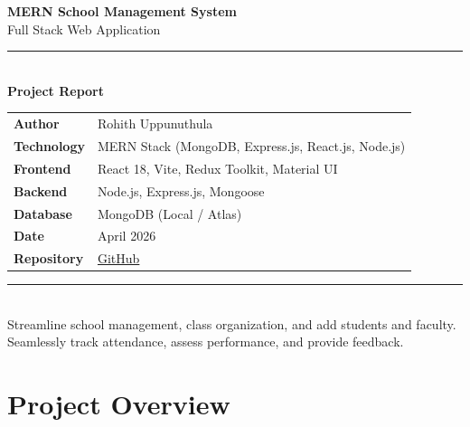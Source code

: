 \documentclass[12pt,a4paper]{report}
\begin{document}
\begin{titlepage}
  \centering
  \vspace*{2cm}

  {\Huge\bfseries\color{primaryblue} MERN School Management System}\\[0.6cm]
  {\large\color{codegray} Full Stack Web Application}\\[0.3cm]
  \rule{\linewidth}{0.5pt}\\[1.5cm]

  {\large\bfseries Project Report}\\[2cm]

  \begin{tabular}{ll}
    \textbf{Author}     & Rohith Uppunuthula \\[4pt]
    \textbf{Technology} & MERN Stack (MongoDB, Express.js, React.js, Node.js) \\[4pt]
    \textbf{Frontend}   & React 18, Vite, Redux Toolkit, Material UI \\[4pt]
    \textbf{Backend}    & Node.js, Express.js, Mongoose \\[4pt]
    \textbf{Database}   & MongoDB (Local / Atlas) \\[4pt]
    \textbf{Date}       & April 2026 \\[4pt]
    \textbf{Repository} & \href{https://github.com/rohith-uppunuthula/MERN-School-Management-System}{GitHub} \\
  \end{tabular}

  \vfill

  \rule{\linewidth}{0.5pt}\\[0.5cm]
  {\small\color{codegray}
    Streamline school management, class organization, and add students and faculty.\\
    Seamlessly track attendance, assess performance, and provide feedback.
  }
\end{titlepage}

\tableofcontents
\newpage

\chapter{Project Overview}
\end{document}
